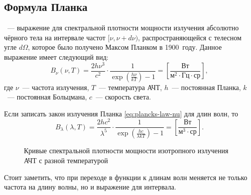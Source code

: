 \subsection{Формула Планка}
\label{sec:planck-law}
~--- выражение для спектральной плотности мощности излучения абсолютно чёрного тела на интервале частот $[\nu, \nu + d \nu)$, распространяющейся с телесном угле $d\Omega$, которое было получено Максом Планком в 1900~году. Данное выражение имеет следующий вид:
\begin{equation}
B_\nu(\nu,T)=\frac{2h\nu^3}{c^2}\cdot \frac{1}{\exp\left(\frac{h\nu}{kT}\right)-1} = \left[ \frac{\text{Вт}}{\text{м}^2 \cdot \text{Гц} \cdot \text{ср}}\right],
\label{eq:plancks-law-nu}
\end{equation}
где $\nu$~--- частота излучения, $T$~--- температура АЧТ, $h$~--- постоянная Планка, $k$~--- постоянная Больцмана, $c$~--- скорость света.

Если записать закон излучения Планка \eqref{eq:plancks-law-nu} для длин волн, то
\begin{equation}
B_\lambda(\lambda,T)=\frac{2hc^2}{\lambda^5} \cdot \frac{1}{\exp\left(\frac{hc}{\lambda kT}\right)-1} = \left[ \frac{\text{Вт}}{\text{м}^3 \cdot \text{ср}}\right].
\label{eq:plancks-law-lambda}
\end{equation}
\begin{wrapfigure}[15]{l}{.6\tw}
\centering
\vspace{-.9pc}
\caption{Кривые спектральной плотности мощности изотропного излучения АЧТ с разной температурой}\label{pic:wien-law}
\end{wrapfigure}
Стоит заметить, что при переходе в функции к длинам волн меняется не только частота на длину волны, но и выражение для интервала. 


